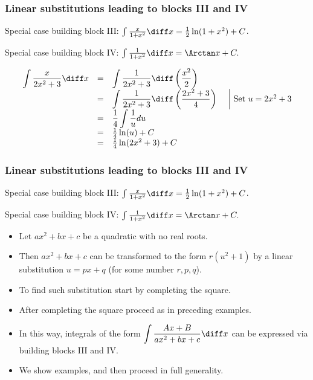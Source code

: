\begin{frame}
\frametitle{Linear substitutions leading to blocks III and IV}
Special case building block III: $ \int \frac{x}{1+x^2}\diff x = \frac{1}{2}\ln(1+x^2)+C$.

Special case building block IV: $ \int \frac{1}{1+x^2 }\diff x=\Arctan x+C.$


\begin{example}
\[
\begin{array}{rcll|l}
\displaystyle \int \frac{x}{2x^2+3}\diff x&=&\displaystyle \int\frac{1}{2x^2+3}\diff \left(\frac{x^2}{2}\right) \\
&=&\displaystyle \int\frac{1}{2x^2+3}\diff \left(\frac{2x^2+3}{4}\right)&&\text{Set } u=2x^2+3 \\
&=&\displaystyle \frac{1}{4}\int \frac{1}{u}du\\
&=&\frac{1}{4}\ln (u)+C\\
&=&\frac{1}{4}\ln (2x^2+3)+C
\end{array}
\]

\end{example}
\vspace{4cm}

\end{frame}
\begin{frame}
\frametitle{Linear substitutions leading to blocks III and IV}
Special case building block III: $ \int \frac{x}{1+x^2}\diff x = \frac{1}{2}\ln(1+x^2)+C$.

Special case building block IV: $\int \frac{1}{1+x^2 }\diff x=\Arctan x+C.$

\begin{itemize}

\item Let $ax^2+bx+c$ be a quadratic with no real roots.
\item Then $ax^2+bx+c$ can be transformed to the form $r(u^2+1)$ by a linear substitution $u=px+q$ (for some number $r, p, q$). 
\item To find such substitution start by completing  the square. 
\item After completing the square proceed as in preceding examples.
\item In this way, integrals of the form $\displaystyle \int \frac{Ax+B}{ax^2+bx+c} \diff x$ can be expressed via building blocks III and IV.

\item We show examples, and then proceed in full generality.
\end{itemize}
\vspace{5cm}
\end{frame}


